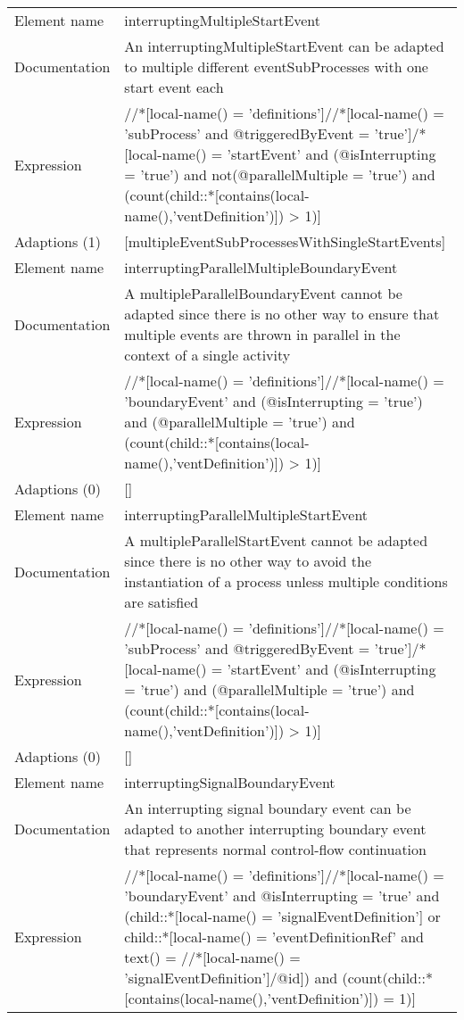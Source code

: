 \begin{center}
\begin{tiny}
\begin{longtable}{p{}|p{}}
\midrule
Element name & interruptingMultipleStartEvent\\
\myrowcolour
Documentation &An interruptingMultipleStartEvent can be adapted to multiple different eventSubProcesses with one start event each\\
Expression & //*[local-name() = 'definitions']//*[local-name() = 'subProcess' and @triggeredByEvent = 'true']/*[local-name() = 'startEvent' and (@isInterrupting = 'true') and not(@parallelMultiple = 'true') and (count(child::*[contains(local-name(),'ventDefinition')]) > 1)]\\
\myrowcolour
Adaptions (1) & [multipleEventSubProcessesWithSingleStartEvents]\\
\midrule
Element name & interruptingParallelMultipleBoundaryEvent\\
\myrowcolour
Documentation &A multipleParallelBoundaryEvent cannot be adapted since there is no other way to ensure that multiple events are thrown in parallel in the context of a single activity\\
Expression & //*[local-name() = 'definitions']//*[local-name() = 'boundaryEvent' and (@isInterrupting = 'true') and (@parallelMultiple = 'true') and (count(child::*[contains(local-name(),'ventDefinition')]) > 1)]\\
\myrowcolour
Adaptions (0) & []\\
\midrule
Element name & interruptingParallelMultipleStartEvent\\
\myrowcolour
Documentation &A multipleParallelStartEvent cannot be adapted since there is no other way to avoid the instantiation of a process unless multiple conditions are satisfied\\
Expression & //*[local-name() = 'definitions']//*[local-name() = 'subProcess' and @triggeredByEvent = 'true']/*[local-name() = 'startEvent' and (@isInterrupting = 'true') and (@parallelMultiple = 'true') and (count(child::*[contains(local-name(),'ventDefinition')]) > 1)]\\
\myrowcolour
Adaptions (0) & []\\
\midrule
Element name & interruptingSignalBoundaryEvent\\
\myrowcolour
Documentation &An interrupting signal boundary event can be adapted to another interrupting boundary event that represents normal control-flow continuation\\
Expression & //*[local-name() = 'definitions']//*[local-name() = 'boundaryEvent' and @isInterrupting = 'true' and (child::*[local-name() = 'signalEventDefinition'] or child::*[local-name() = 'eventDefinitionRef' and text() = //*[local-name() = 'signalEventDefinition']/@id]) and (count(child::*[contains(local-name(),'ventDefinition')]) = 1)]\\

\end{longtable}
\end{tiny}
\end{center}

